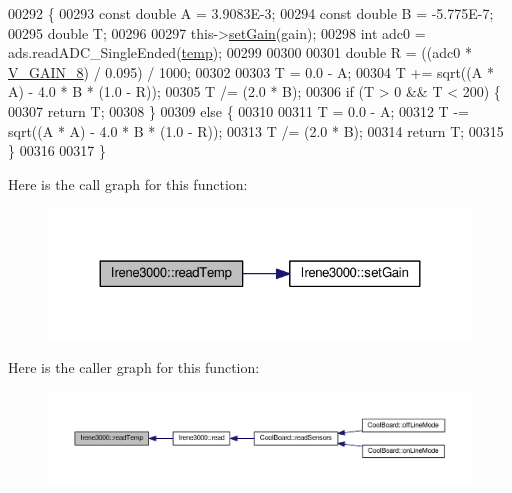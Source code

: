 \begin{DoxyCode}
00292 \{
00293   \textcolor{keyword}{const} \textcolor{keywordtype}{double} A = 3.9083E-3;
00294   \textcolor{keyword}{const} \textcolor{keywordtype}{double} B = -5.775E-7;
00295   \textcolor{keywordtype}{double} T;
00296   
00297   this->\hyperlink{class_irene3000_aff7c5da186b388e7272e63ff88a20c34}{setGain}(gain);
00298   \textcolor{keywordtype}{int} adc0 = ads.readADC\_SingleEnded(\hyperlink{_irene3000_8h_a5905d48604152cf57aa6bfa087b49173}{temp});
00299  
00300 
00301   \textcolor{keywordtype}{double} R = ((adc0 * \hyperlink{_irene3000_8h_ab7ab16df599d3f0ce29e12791a504891}{V\_GAIN\_8}) / 0.095) / 1000;
00302 
00303   T = 0.0 - A;
00304   T += sqrt((A * A) - 4.0 * B * (1.0 - R));
00305   T /= (2.0 * B);
00306   \textcolor{keywordflow}{if} (T > 0 && T < 200) \{
00307     \textcolor{keywordflow}{return} T;
00308   \}
00309   \textcolor{keywordflow}{else} \{
00310   
00311     T = 0.0 - A;
00312     T -= sqrt((A * A) - 4.0 * B * (1.0 - R));
00313     T /= (2.0 * B);
00314     \textcolor{keywordflow}{return} T;
00315   \}
00316 
00317 \}
\end{DoxyCode}
Here is the call graph for this function\+:
\nopagebreak
\begin{figure}[H]
\begin{center}
\leavevmode
\includegraphics[width=324pt]{class_irene3000_a94ad40f281d83ad1be20bf1edd6fe802_cgraph}
\end{center}
\end{figure}
Here is the caller graph for this function\+:
\nopagebreak
\begin{figure}[H]
\begin{center}
\leavevmode
\includegraphics[width=350pt]{class_irene3000_a94ad40f281d83ad1be20bf1edd6fe802_icgraph}
\end{center}
\end{figure}
\mbox{\label{class_irene3000_a0fba280e8b7c881307efa31281aa691d}} 
